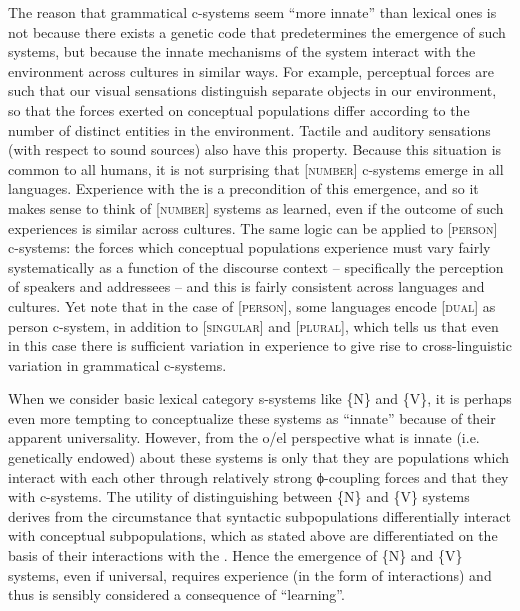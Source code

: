 The reason that grammatical c-systems seem “more innate” than lexical ones is not because there exists a genetic code that predetermines the emergence of such systems, but because the innate mechanisms of the system interact with the environment across cultures in similar ways. For example, perceptual  forces are such that our visual sensations distinguish separate objects in our environment, so that the  forces exerted on conceptual populations differ according to the number of distinct entities in the environment. Tactile and auditory sensations (with respect to sound sources) also have this property. Because this situation is common to all humans, it is not surprising that [\textsc{number}] c-systems emerge in all languages. Experience with the  is a precondition of this emergence, and so it makes sense to think of [\textsc{number}] systems as learned, even if the outcome of such experiences is similar across cultures. The same logic can be applied to [\textsc{person}] c-systems: the  forces which conceptual populations experience must vary fairly systematically as a function of the discourse context -- specifically the perception of speakers and addressees -- and this is fairly consistent across languages and cultures. Yet note that in the case of [\textsc{person}], some languages encode [\textsc{dual}] as person c-system, in addition to [\textsc{singular}] and [\textsc{plural}], which tells us that even in this case there is sufficient variation in experience to give rise to cross-linguistic variation in grammatical c-systems.

When we consider basic lexical category s-systems like \{N\} and \{V\}, it is perhaps even more tempting to conceptualize these systems as “innate” because of their apparent universality. However, from the o/el perspective what is innate (i.e. genetically endowed) about these systems is only that they are populations which interact with each other through relatively strong ϕ{}-coupling forces and that they  with c-systems. The utility of distinguishing between \{N\} and \{V\} systems derives from the circumstance that syntactic subpopulations differentially interact with conceptual subpopulations, which as stated above are differentiated on the basis of their interactions with the . Hence the emergence of \{N\} and \{V\} systems, even if universal, requires experience (in the form of  interactions) and thus is sensibly considered a consequence of “learning”. 

